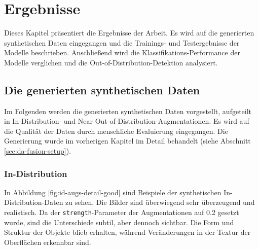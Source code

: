 \chapter{Ergebnisse} \label{sec:results}

Dieses Kapitel präsentiert die Ergebnisse der Arbeit. Es wird auf die generierten synthetischen Daten eingegangen und die Trainings- und Testergebnisse der Modelle beschrieben. Anschließend wird die Klassifikations-Performance der Modelle verglichen und die Out-of-Distribution-Detektion analysiert.

\section{Die generierten synthetischen Daten} \label{sec:da-fusion-results}

Im Folgenden werden die generierten synthetischen Daten vorgestellt, aufgeteilt in In-Distribution- und Near Out-of-Distribution-Augmentationen. Es wird auf die Qualität der Daten durch menschliche Evaluierung eingegangen. Die Generierung wurde im vorherigen Kapitel im Detail behandelt (siehe Abschnitt \ref{sec:da-fusion-setup}).


\subsection{In-Distribution} \label{sec:da-fusion-id-results}

In Abbildung \ref{fig:id-augs-detail-good} sind Beispiele der synthetischen In-Distribution-Daten zu sehen. Die Bilder sind überwiegend sehr überzeugend und realistisch. Da der \lstinline{strength}-Parameter der Augmentationen auf 0.2 gesetzt wurde, sind die Unterschiede subtil, aber dennoch sichtbar. Die Form und Struktur der Objekte blieb erhalten, während Veränderungen in der Textur der Oberflächen erkennbar sind.

